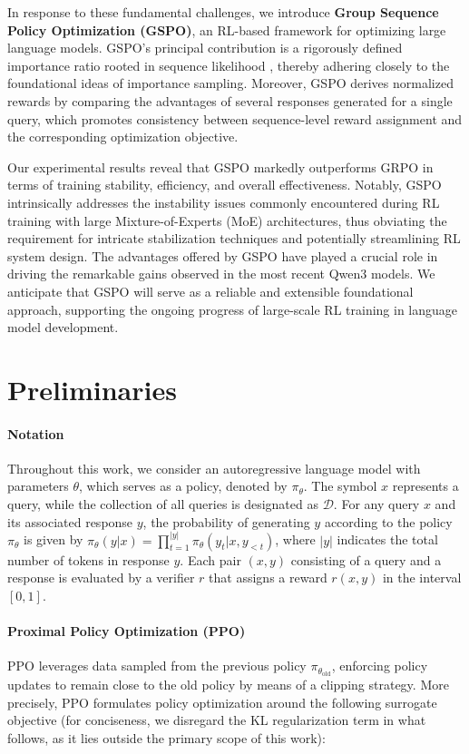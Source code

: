 In response to these fundamental challenges, we introduce \textbf{Group Sequence Policy Optimization (GSPO)}, an RL-based framework for optimizing large language models. GSPO’s principal contribution is a rigorously defined importance ratio rooted in sequence likelihood \citep{click}, thereby adhering closely to the foundational ideas of importance sampling. Moreover, GSPO derives normalized rewards by comparing the advantages of several responses generated for a single query, which promotes consistency between sequence-level reward assignment and the corresponding optimization objective.

Our experimental results reveal that GSPO markedly outperforms GRPO in terms of training stability, efficiency, and overall effectiveness. Notably, GSPO intrinsically addresses the instability issues commonly encountered during RL training with large Mixture-of-Experts (MoE) architectures, thus obviating the requirement for intricate stabilization techniques and potentially streamlining RL system design. The advantages offered by GSPO have played a crucial role in driving the remarkable gains observed in the most recent Qwen3 models. We anticipate that GSPO will serve as a reliable and extensible foundational approach, supporting the ongoing progress of large-scale RL training in language model development.

\section{Preliminaries}

\paragraph{Notation}
Throughout this work, we consider an autoregressive language model with parameters $\theta$, which serves as a policy, denoted by $\pi_\theta$. The symbol $x$ represents a query, while the collection of all queries is designated as $\mathcal{D}$. For any query $x$ and its associated response $y$, the probability of generating $y$ according to the policy $\pi_\theta$ is given by $\pi_\theta (y | x)=\prod_{t=1}^{|y|} \pi_\theta (y_t | x, y_{<t} )$, where $|y|$ indicates the total number of tokens in response $y$. Each pair $(x, y)$ consisting of a query and a response is evaluated by a verifier $r$ that assigns a reward $r(x, y)$ in the interval $[ 0, 1 ]$.

\paragraph{Proximal Policy Optimization (PPO)} PPO \citep{ppo} leverages data sampled from the previous policy $\pi_{\theta_\text{old}}$, enforcing policy updates to remain close to the old policy by means of a clipping strategy. More precisely, PPO formulates policy optimization around the following surrogate objective (for conciseness, we disregard the KL regularization term in what follows, as it lies outside the primary scope of this work):

